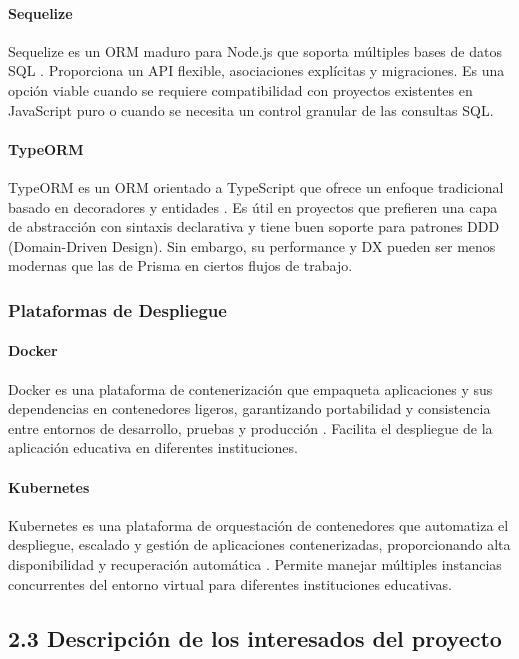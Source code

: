 \paragraph{Sequelize}
Sequelize es un ORM maduro para Node.js que soporta múltiples bases de datos SQL \cite{sequelize_docs2023}. Proporciona un API flexible, asociaciones explícitas y migraciones. Es una opción viable cuando se requiere compatibilidad con proyectos existentes en JavaScript puro o cuando se necesita un control granular de las consultas SQL.

\paragraph{TypeORM}
TypeORM es un ORM orientado a TypeScript que ofrece un enfoque tradicional basado en decoradores y entidades \cite{typeorm_docs2022}. Es útil en proyectos que prefieren una capa de abstracción con sintaxis declarativa y tiene buen soporte para patrones DDD (Domain-Driven Design). Sin embargo, su performance y DX pueden ser menos modernas que las de Prisma en ciertos flujos de trabajo.

\subsubsection{Plataformas de Despliegue}

\paragraph{Docker}
Docker es una plataforma de contenerización que empaqueta aplicaciones y sus dependencias en contenedores ligeros, garantizando portabilidad y consistencia entre entornos de desarrollo, pruebas y producción \cite{docker2023}. Facilita el despliegue de la aplicación educativa en diferentes instituciones.

\paragraph{Kubernetes}
Kubernetes es una plataforma de orquestación de contenedores que automatiza el despliegue, escalado y gestión de aplicaciones contenerizadas, proporcionando alta disponibilidad y recuperación automática \cite{kubernetes2023}. Permite manejar múltiples instancias concurrentes del entorno virtual para diferentes instituciones educativas.

\subsection{2.3 Descripción de los interesados del proyecto}


